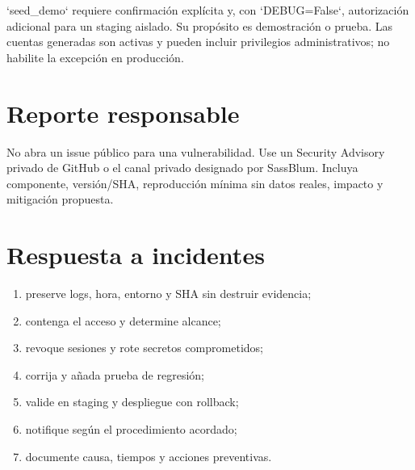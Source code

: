 `seed\_demo` requiere confirmación explícita y, con `DEBUG=False`, autorización adicional para un
staging aislado. Su propósito es demostración o prueba. Las cuentas generadas son activas y pueden
incluir privilegios administrativos; no habilite la excepción en producción.

\section{Reporte responsable}

No abra un issue público para una vulnerabilidad. Use un Security Advisory privado de GitHub o el
canal privado designado por SassBlum. Incluya componente, versión/SHA, reproducción mínima sin datos
reales, impacto y mitigación propuesta.

\section{Respuesta a incidentes}

\begin{enumerate}
  \item preserve logs, hora, entorno y SHA sin destruir evidencia;
  \item contenga el acceso y determine alcance;
  \item revoque sesiones y rote secretos comprometidos;
  \item corrija y añada prueba de regresión;
  \item valide en staging y despliegue con rollback;
  \item notifique según el procedimiento acordado;
  \item documente causa, tiempos y acciones preventivas.
\end{enumerate}


